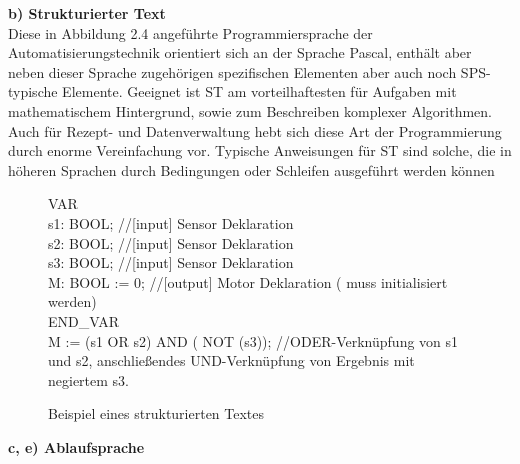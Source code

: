 	\color{black}
	\textbf{b) Strukturierter Text}\\
	
	Diese in Abbildung 2.4 angeführte Programmiersprache der Automatisierungstechnik orientiert sich an der Sprache Pascal, enthält aber neben dieser Sprache zugehörigen spezifischen Elementen aber auch noch SPS-typische Elemente. Geeignet ist ST am vorteilhaftesten für Aufgaben mit mathematischem Hintergrund, sowie zum Beschreiben komplexer Algorithmen. Auch für Rezept- und Datenverwaltung hebt sich diese Art der Programmierung durch enorme Vereinfachung vor. Typische Anweisungen für ST sind solche, die in höheren Sprachen durch Bedingungen oder Schleifen ausgeführt werden können \cite{grundlagen_automatisierungstechnik}
	
	\begin{figure}[h]
		\begin{framed}
		\color{black}
		VAR\\
		s1: BOOL; \color{gray}//[input] Sensor Deklaration\\ \color{black}
		s2: BOOL; \color{gray}//[input] Sensor Deklaration\\ \color{black}
		s3: BOOL; \color{gray}//[input] Sensor Deklaration\\ \color{black}
		M: BOOL := 0; \color{gray}//[output] Motor Deklaration ( muss initialisiert werden)\\ \color{black}
		END\_VAR\\
		M := (s1 OR s2) AND ( NOT (s3)); \color{gray}//ODER-Verknüpfung von s1 und s2, anschließendes UND-Verknüpfung von Ergebnis mit negiertem s3.\
		\end{framed}
		\caption{Beispiel eines strukturierten Textes}
	\end{figure}
	
	\color{black}
	\textbf{c, e) Ablaufsprache}\\
	
